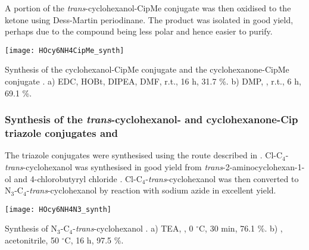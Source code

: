 A portion of the \textit{trans}-cyclohexanol-CipMe conjugate  was then oxidised to the ketone using Dess-Martin periodinane. The product was isolated in good yield, perhaps due to the compound being less polar and hence easier to purify.

\begin{scheme}[H]
	\begin{center}
		\texttt{[image: HOcy6NH4CipMe\_synth]}
		\caption{Synthesis of the cyclohexanol-CipMe conjugate  and the cyclohexanone-CipMe conjugate . 
		a) EDC, HOBt, DIPEA, DMF, r.t., 16 h, 31.7 \%.
		b) DMP, , r.t., 6 h, 69.1 \%.
		\label{sch:HOcy6NH4CipMe_synth}}
	\end{center}
\end{scheme}

\subsubsection{Synthesis of the \textit{trans}-cyclohexanol- and cyclohexanone-Cip triazole conjugates  and }

The triazole conjugates were synthesised using the route described in \label{sec:Cl4Cl}. Cl-C$_4$-\textit{trans}-cyclohexanol  was synthesised in good yield from \textit{trans}-2-aminocyclohexan-1-ol  and 4-chlorobutyryl chloride . 
Cl-C$_4$-\textit{trans}-cyclohexanol  was then converted to N$_3$-C$_4$-\textit{trans}-cyclohexanol  by reaction with sodium azide in excellent yield. 

\begin{scheme}[H]
	\begin{center}
		\texttt{[image: HOcy6NH4N3\_synth]}
		\caption{Synthesis of N$_3$-C$_4$-\textit{trans}-cyclohexanol . 
		a) TEA, , 0 $^{\circ}$C, 30 min, 76.1 \%.
		b) , acetonitrile, 50 $^\circ$C, 16 h, 97.5 \%.
		\label{sch:HOcy6NH4N3_synth}}
	\end{center}
\end{scheme}

